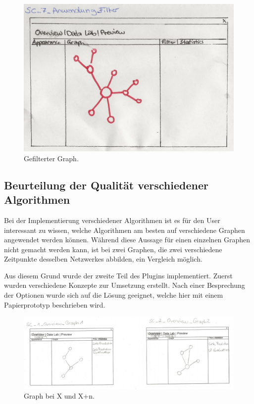 \begin{figure}
    \includegraphics[width=\linewidth]{resources/SC-7.png}
    \caption{Gefilterter Graph.}
    \label{fig:screen7}
\end{figure}

\subsection{Beurteilung der Qualität verschiedener Algorithmen}

Bei der Implementierung verschiedener Algorithmen ist es für den User interessant zu wissen, welche Algorithmen am
besten auf verschiedene Graphen angewendet werden können. Während diese Aussage für einen einzelnen Graphen nicht gemacht
werden kann, ist bei zwei Graphen, die zwei verschiedene Zeitpunkte desselben Netzwerkes abbilden, ein Vergleich möglich.

Aus diesem Grund wurde der zweite Teil des Plugins implementiert. Zuerst wurden verschiedene Konzepte zur Umsetzung
erstellt. Nach einer Besprechung der Optionen wurde sich auf die Lösung geeignet, welche hier mit einem Papierprototyp
beschrieben wird.

\begin{figure}
    \includegraphics[width=\linewidth]{resources/EV-1.png}
    \caption{Graph bei X und X+n.}
    \label{fig:screen8}
\end{figure}

